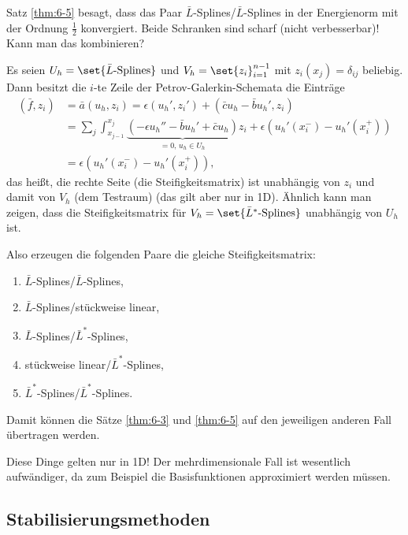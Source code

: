 Satz \ref{thm:6-5} besagt, dass das Paar $\bar L$-Splines/$\bar L$-Splines in der Energienorm mit der Ordnung $\frac 12$ konvergiert. Beide Schranken sind scharf (nicht verbesserbar)! Kann man das kombinieren?

\begin{bemerkung}\label{rem:6-6}
  Es seien $U_{h} = \set{\bar L\text{-Splines}}$ und $V_{h} = \set{z_{i}}_{i = 1}^{n-1}$ mit $z_i(x_{j}) = \delta_{ij}$ beliebig. Dann besitzt die $i$-te Zeile der Petrov-Galerkin-Schemata die Einträge
  \begin{align*}
    (\bar f, z_{i}) &= \bar a (u_{h}, z_{i}) = \epsilon(u_{h}', z_{i}') + (\bar c u_{h} - \bar b u_{h}', z_{i})\\
    &= \sum_{j} \int_{x_{j-1}}^{x_{j}} \underbrace{(-\epsilon u_{h}'' - \bar b u_{h}' + \bar c u_{h})}_{= 0, \, u_{h} \in U_{h}}z_{i} + \epsilon(u_{h}'(x_{i}^{-}) - u_{h}'(x_{i}^{+})) \\
    &= \epsilon(u_{h}'(x_{i}^{-}) - u_{h}'(x_{i}^{+})), 
  \end{align*}
  das heißt, die rechte Seite (die Steifigkeitsmatrix) ist unabhängig von $z_{i}$ und damit von $V_{h}$ (dem Testraum) (das gilt aber nur in 1D). Ähnlich kann man zeigen, dass die Steifigkeitsmatrix für $V_{h} = \set{\bar L^{*}\text{-Splines}}$ unabhängig von $U_{h}$ ist. 

  Also erzeugen die folgenden Paare die gleiche Steifigkeitsmatrix: 
  \begin{enumerate}
  \item $\bar L$-Splines/$\bar L$-Splines,
  \item $\bar L$-Splines/stückweise linear,
  \item $\bar L$-Splines/$\bar L^{*}$-Splines, 
  \item stückweise linear/$\bar L^{*}$-Splines,
  \item $\bar L^{*}$-Splines/$\bar L^{*}$-Splines.
  \end{enumerate}
  Damit können die Sätze  \ref{thm:6-3} und  \ref{thm:6-5} auf den jeweiligen anderen Fall übertragen werden. 
\end{bemerkung}
Diese Dinge gelten nur in 1D! Der mehrdimensionale Fall ist wesentlich aufwändiger, da zum Beispiel die Basisfunktionen approximiert werden müssen. 

\subsection{Stabilisierungsmethoden}
\label{sec:stab}

